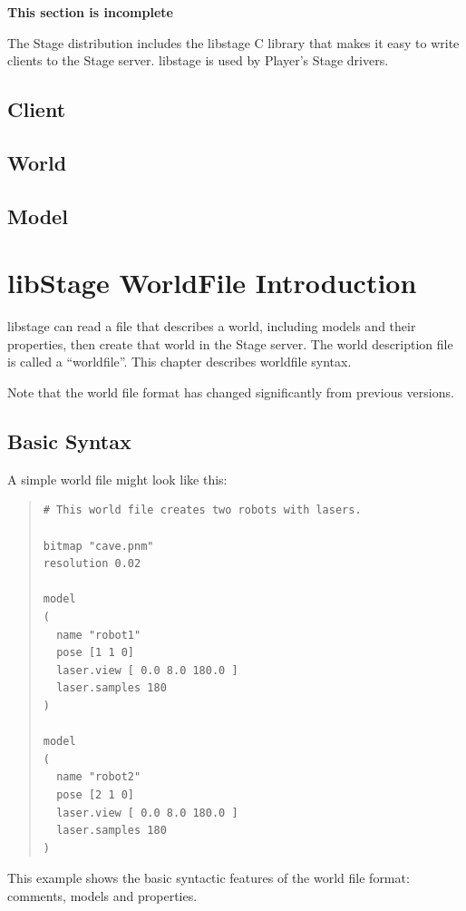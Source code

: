 \documentclass[letter,11pt,twoside]{report}
\begin{document}
{\bf This section is incomplete}

The Stage distribution includes the libstage C library that makes it
easy to write clients to the Stage server. libstage is used by
Player's Stage drivers.

\section{Client}

\section{World}

\section{Model}

\chapter{libStage WorldFile Introduction}
\label{sec:world}

libstage can read a file that describes a world, including models and
their properties, then create that world in the Stage server. The
world description file is called a ``worldfile''. This chapter
describes worldfile syntax.

Note that the world file format has changed significantly from
previous versions.

\section{Basic Syntax}

A simple world file might look like this:
\begin{quote}
\begin{verbatim}
# This world file creates two robots with lasers.

bitmap "cave.pnm" 
resolution 0.02

model
( 
  name "robot1" 
  pose [1 1 0] 
  laser.view [ 0.0 8.0 180.0 ]	
  laser.samples 180
)

model
( 
  name "robot2" 
  pose [2 1 0] 
  laser.view [ 0.0 8.0 180.0 ]	
  laser.samples 180
)
\end{verbatim}
\end{quote}
This example shows the basic syntactic features of the 
world file format: comments, models and properties.
\end{document}
